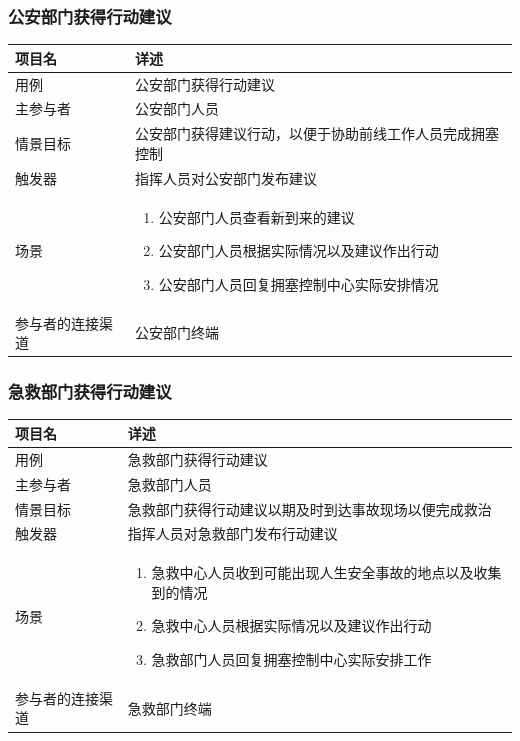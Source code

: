\documentclass{ctexrep}
\begin{document}
\subsubsection{公安部门获得行动建议}
\begin{longtable}{p{2cm} | p{10cm}}
\hline
项目名 & 详述 \\
\hline
\hline
用例 & 公安部门获得行动建议\\
\hline
主参与者 & 公安部门人员 \\
\hline
情景目标 &  公安部门获得建议行动，以便于协助前线工作人员完成拥塞控制\\
\hline
触发器 &  指挥人员对公安部门发布建议\\
\hline
场景 & \begin{enumerate}
	\item 公安部门人员查看新到来的建议
	\item 公安部门人员根据实际情况以及建议作出行动
	\item 公安部门人员回复拥塞控制中心实际安排情况
\end{enumerate} \\
\hline
参与者的连接渠道 & 公安部门终端 \\
\hline
\end{longtable}

\subsubsection{急救部门获得行动建议}
\begin{longtable}{p{2cm} | p{10cm}}
\hline
项目名 & 详述 \\
\hline
\hline
用例 & 急救部门获得行动建议\\
\hline
主参与者 & 急救部门人员 \\
\hline
情景目标 & 急救部门获得行动建议以期及时到达事故现场以便完成救治 \\
\hline
触发器 & 指挥人员对急救部门发布行动建议 \\
\hline
场景 & \begin{enumerate}
	\item 急救中心人员收到可能出现人生安全事故的地点以及收集到的情况
	\item 急救中心人员根据实际情况以及建议作出行动
	\item 急救部门人员回复拥塞控制中心实际安排工作
\end{enumerate} \\
\hline
参与者的连接渠道 & 急救部门终端 \\
\hline
\end{longtable}
\end{document}
